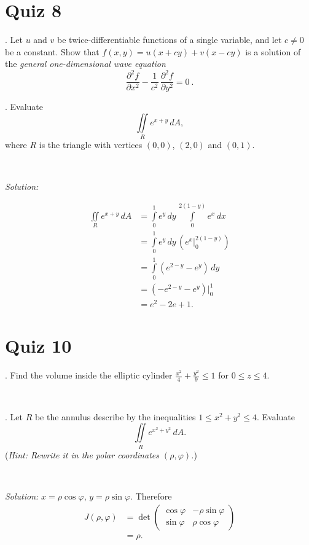 \documentclass{article}
\def\le{\leqslant}%
\def\phi{\varphi}%
\begin{document}
\section*{
Quiz 8
}

. Let $u$ and $v$ be twice-differentiable functions of a single variable, and let $c\ne 0$ be a constant.
  Show that $f(x,y)=u(x+cy)+v(x-cy)$ is a
  solution of the \emph{general one-dimensional wave equation}
\begin{displaymath}
   \frac{\partial^2 f}{\partial x^2} - \frac{1}{c^2}\,\frac{\partial^2 f}{\partial y^2} = 0 ~.
  \end{displaymath}





. Evaluate 
\[\iint\limits_{R} e^{x+y}\,dA,\]
where $R$ is the triangle with vertices $(0,0)$, $(2,0)$ and $(0,1)$.

\ 
  

\noindent\textit{Solution:}

\begin{align*}
\iint\limits_R e^{x+y}\,dA 
&=
\int\limits_0^1e^y\,dy\,\int\limits_0^{2(1-y)} e^x\,dx
\\
&=
\int\limits_0^1 e^y\,dy\, \left(e^x|_0^{2(1-y)}\right)
\\
&=
\int\limits_0^1 (e^{2-y}-e^y)\,dy
\\
&=
(-e^{2-y}-e^y)|_0^1
\\
&=e^2-2e+1.
\end{align*}

\section*{
Quiz 10
}

. 
Find the volume inside the elliptic cylinder $\frac{x^2}{4} + \frac{y^2}{9} \le 1$ for $0\le z\le 4$.


\ 



. 
Let $R$ be the annulus describe by the inequalities $1\le x^2+y^2\le 4$.
Evaluate 
\[\iint\limits_{R} e^{x^2+y^2}\,dA.\]
(\textit{Hint: Rewrite it in the polar coordinates $(\rho,\phi)$.})

\ 
  

\noindent\textit{Solution:} $x=\rho\cos\phi$, $y=\rho\sin\phi$.
Therefore
\begin{align*}
J(\rho,\phi)&=\det
\left(
\begin{matrix}
\cos\phi&-\rho\sin\phi
\\
\sin\phi&\rho\cos\phi
\end{matrix}
\right)
\\
&=\rho.
\end{align*}
\end{document}
